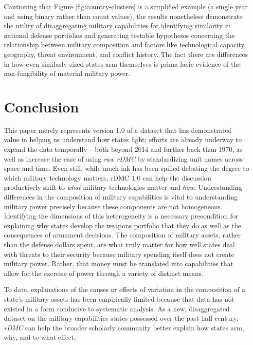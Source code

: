 \documentclass[
]{article}
\begin{document}
Cautioning that Figure \ref{fig:country-clusters} is a simplified example (a single year and using binary rather than count values), the results nonetheless demonstrate the utility of disaggregating military capabilities for identifying similarity in national defense portfolios and generating testable hypotheses concerning the relationship between military composition and factors like technological capacity, geography, threat environment, and conflict history. The fact there are differences in how even similarly-sized states arm themselves is prima facie evidence of the non-fungibility of material military power.

\hypertarget{conclusion}{%
\section{Conclusion}\label{conclusion}}

This paper merely represents version 1.0 of a dataset that has demonstrated value in helping us understand how states fight; efforts are already underway to expand the data temporally -- both beyond 2014 and further back than 1970, as well as increase the ease of using \emph{raw rDMC} by standardizing unit names across space and time. Even still, while much ink has been spilled debating the degree to which military technology matters, rDMC 1.0 can help the discussion productively shift to \emph{what} military technologies matter and \emph{how}. Understanding differences in the composition of military capabilities is vital to understanding military power precisely because these components are not homogeneous. Identifying the dimensions of this heterogeneity is a necessary precondition for explaining why states develop the weapons portfolio that they do as well as the consequences of armament decisions. The composition of military assets, rather than the defense dollars spent, are what truly matter for how well states deal with threats to their security because military spending itself does not create military power. Rather, that money must be translated into capabilities that allow for the exercise of power through a variety of distinct means.

To date, explanations of the causes or effects of variation in the composition of a state's military assets has been empirically limited because that data has not existed in a form conducive to systematic analysis. As a new, disaggregated dataset on the military capabilities states possessed over the past half century, \emph{rDMC} can help the broader scholarly community better explain how states arm, why, and to what effect.
\end{document}
